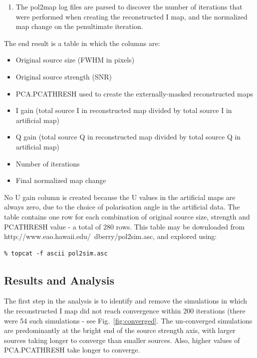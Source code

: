 \documentclass[twoside,11pt]{starlink}
\begin{document}
\begin{enumerate}
\item The pol2map log files are parsed to discover the number of
iterations that were performed when creating the reconstructed I map,
and the normalized map change on the penultimate iteration.

\end{enumerate}

The end result is a table in which the columns are:

\begin{itemize}
\item Original source size (FWHM in pixels)
\item Original source strength (SNR)
\item PCA.PCATHRESH used to create the externally-masked reconstructed maps
\item I gain (total source I in reconstructed map divided by total source I in artificial map)
\item Q gain (total source Q in reconstructed map divided by total source Q in artificial map)
\item Number of iterations
\item Final normalized map change
\end{itemize}

No U gain column is created because the U values in the artificial maps
are always zero, due to the choice of polarisation angle in the artificial
data. The table contains one row for each combination of original source size,
strength and PCATHRESH value - a total of 280 rows. This table may be
downloaded from
{http://www.eao.hawaii.edu/~dberry/pol2sim.asc}, and explored using:

\begin{verbatim}
% topcat -f ascii pol2sim.asc
\end{verbatim}

\subsection{Results and Analysis}

The first step in the analysis is to identify and remove the simulations
in which the reconstructed I map did not reach convergence within 200 iterations (there
were 54 such simulations - see Fig.~\ref{fig:converged}. The un-converged
simulations are predominantly at the bright end of the source strength
axis, with larger sources taking longer to converge than smaller sources.
Also, higher values of PCA.PCATHRESH take longer to converge.
\end{document}
